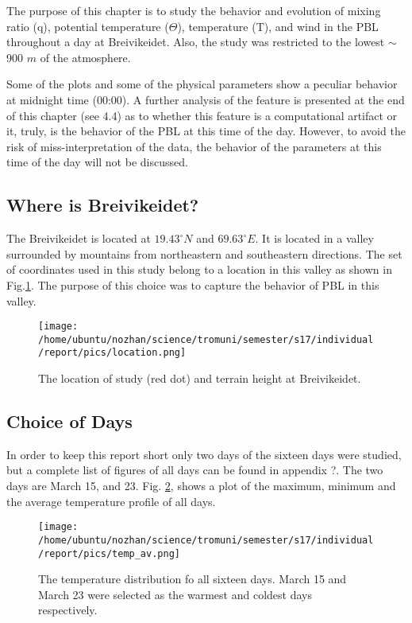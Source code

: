 \documentclass[a4paper,12pt]{article}
\numberwithin{equation}{section} %
\begin{document}
The purpose of this chapter is to study the behavior and evolution of mixing ratio (q), potential temperature ($\Theta$), temperature (T), and wind in the PBL throughout a day at Breivikeidet. Also, the study was restricted to the lowest $\sim$ 900 $m$ of the atmosphere.

Some of the plots and some of the physical parameters show a peculiar behavior at midnight time (00:00). A further analysis of the feature is presented at the end of this chapter (see 4.4) as to whether this feature is a computational artifact or it, truly, is the behavior of the PBL at this time of the day. However, to avoid the risk of miss-interpretation of the data, the behavior of the parameters at this time of the day will not be discussed.

\subsection{Where is Breivikeidet?}

The Breivikeidet is located at $19.43^\circ N$ and $69.63^\circ E$. It is located in a valley surrounded by mountains from northeastern and southeastern directions. The set of coordinates used in this study belong to a location in this valley as shown in Fig.\ref{location}. The purpose of this choice was to capture the behavior of PBL in this valley.

\begin{figure}[bhp]
\texttt{[image: /home/ubuntu/nozhan/science/tromuni/semester/s17/individual/report/pics/location.png]}
\caption{The location of study (red dot) and terrain height at Breivikeidet.}
\label{location}
\end{figure}

\subsection{Choice of Days}
In order to keep this report short only two days of the sixteen days were studied, but a complete list of figures of all days can be found in appendix ?. The two days are March 15, and 23. Fig. \ref{warmcold}, shows a plot of the maximum, minimum and the average temperature profile of all days.

\vspace{2.5 cm}

\begin{figure}[bhp]
	\texttt{[image: /home/ubuntu/nozhan/science/tromuni/semester/s17/individual/report/pics/temp\_av.png]}
	\caption{The temperature distribution fo all sixteen days. March 15 and March 23 were selected as the warmest and coldest days respectively.}
	\label{warmcold}
\end{figure}
\end{document}
